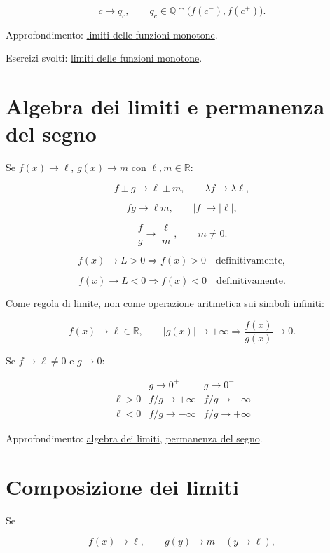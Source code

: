 \[
c\longmapsto q_c,
\qquad
q_c\in\mathbb Q\cap\bigl(f(c^-),f(c^+)\bigr).
\]

Approfondimento: \href{https://ingegnerismo.it/matematica/limiti-delle-funzioni-monotone/}{limiti delle funzioni monotone}.

Esercizi svolti: \href{https://ingegnerismo.it/matematica/limiti-funzioni-monotone-esercizi/}{limiti delle funzioni monotone}.

\section{Algebra dei limiti e permanenza del segno}\label{algebra-dei-limiti-e-permanenza-del-segno}

Se \(f(x)\to\ell\), \(g(x)\to m\) con \(\ell,m\in\mathbb R\):

\[
f\pm g\to\ell\pm m,
\qquad
\lambda f\to\lambda\ell,
\]

\[
fg\to\ell m,
\qquad
|f|\to|\ell|,
\]

\[
\frac fg\to\frac\ell m,
\qquad m\ne0.
\]

\[
f(x)\to L>0
\Longrightarrow
f(x)>0\quad\text{definitivamente},
\]

\[
f(x)\to L<0
\Longrightarrow
f(x)<0\quad\text{definitivamente}.
\]

Come regola di limite, non come operazione aritmetica sui simboli infiniti:

\[
f(x)\to\ell\in\mathbb R,
\qquad
|g(x)|\to+\infty
\Longrightarrow
\frac{f(x)}{g(x)}\to0.
\]

Se \(f\to\ell\ne0\) e \(g\to0\):

\[
\begin{array}{c|cc}
&g\to0^+&g\to0^-\\
\hline
\ell>0&f/g\to+\infty&f/g\to-\infty\\
\ell<0&f/g\to-\infty&f/g\to+\infty
\end{array}
\]

Approfondimento: \href{https://ingegnerismo.it/matematica/algebra-dei-limiti/}{algebra dei limiti}, \href{https://ingegnerismo.it/matematica/permanenza-del-segno/}{permanenza del segno}.

\section{Composizione dei limiti}\label{composizione-dei-limiti}

Se

\[
f(x)\to\ell,
\qquad
g(y)\to m\quad(y\to\ell),
\]

